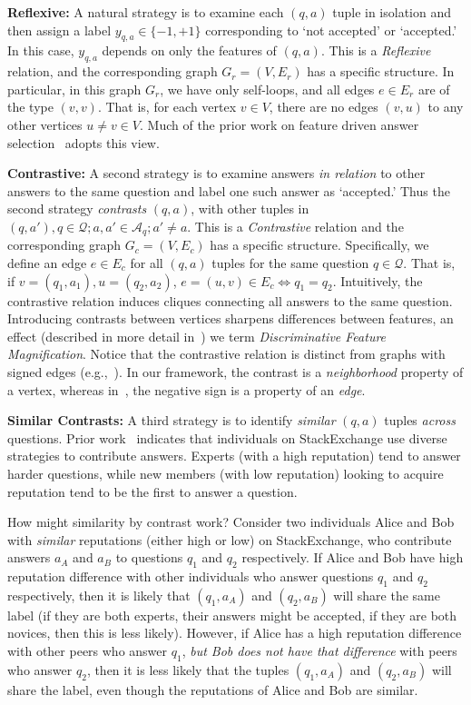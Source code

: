 \textbf{Reflexive:}
\label{sub:Reflexive}
A natural strategy is to examine each $(q,a)$ tuple in isolation and then assign a label $y_{q,a} \in \{-1,+1 \}$ corresponding to `not accepted' or `accepted.' In this case, $y_{q,a}$ depends on only the features of $(q,a)$. This is a \emph{Reflexive} relation, and the corresponding graph $G_r = (V,E_r)$ has a specific structure. In particular, in this graph $G_r$, we have only self-loops, and all edges $e \in E_r$ are of the type $(v,v)$. That is, for each vertex $v \in V$, there are no edges $(v,u)$ to any other vertices $u\neq v \in V$. Much of the prior work on feature driven answer selection~\cite{BurelMA16,  JendersKN16, TianZL13, TianL16} adopts this view.

\textbf{Contrastive:}
\label{sub:Contrastive}
A second strategy is to examine answers \textit{in relation} to other answers to the same question and label one such answer as `accepted.' Thus the second strategy \textit{contrasts} $(q,a)$, with other tuples in  $(q,a'), q \in \mathcal{Q}; a, a' \in \mathcal{A}_q; a'\neq a$. This is a \emph{Contrastive} relation and the corresponding graph $G_c = (V,E_c)$ has a specific structure. Specifically, we define an edge $e \in E_c$ for all $(q,a)$ tuples for the same question $q \in \mathcal{Q}$. That is, if  $v = (q_1, a_1), u=(q_2, a_2)$, $e=(u, v) \in E_c \iff q_1=q_2$. Intuitively, the contrastive relation induces cliques connecting all answers to the same question. Introducing contrasts between vertices sharpens differences between features, an effect (described in more detail in~) we term \emph{Discriminative Feature Magnification}. Notice that the contrastive relation is distinct from graphs with signed edges (e.g.,~\cite{signedgcn}). In our framework, the contrast is a \textit{neighborhood} property of a vertex, whereas in~\cite{signedgcn}, the negative sign is a property of an \textit{edge}.

\textbf{Similar Contrasts:}
\label{sub:Similar}
A third strategy is to identify \textit{similar} $(q,a)$ tuples \textit{across} questions. Prior work~\cite{Wu2016} indicates that individuals on StackExchange use diverse strategies to contribute answers. Experts (with a high reputation) tend to answer harder questions, while new members (with low reputation)  looking to acquire reputation tend to be the first to answer a question.

How might similarity by contrast work? Consider two individuals Alice and Bob with \textit{similar} reputations (either high or low) on StackExchange, who contribute answers $a_A$ and $a_B$ to questions $q_1$ and $q_2$ respectively. If Alice and Bob have high reputation difference with other individuals who answer questions $q_1$ and $q_2$ respectively, then it is likely that $(q_1, a_A)$ and $(q_2, a_B)$ will share the same label (if they are both experts, their answers might be accepted, if they are both novices, then this is less likely). However, if Alice has a high reputation difference with other peers who answer $q_1$, \textit{but Bob does not have that difference} with peers who answer $q_2$, then it is less likely that the tuples $(q_1, a_A)$ and $(q_2, a_B)$ will share the label, even though the reputations of Alice and Bob are similar.

